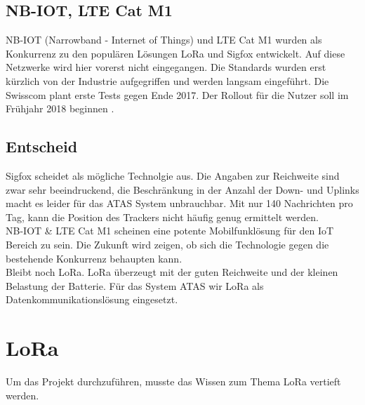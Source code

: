 \documentclass[11pt,english,german]{report}
\theoremstyle{definition}
\begin{document}
\newpage
\subsection{NB-IOT, LTE Cat M1}
NB-IOT (Narrowband - Internet of Things) und LTE Cat M1 wurden als Konkurrenz zu den populären Lösungen LoRa und Sigfox entwickelt. Auf diese Netzwerke wird hier vorerst nicht eingegangen. Die Standards wurden erst kürzlich von der Industrie aufgegriffen und werden langsam eingeführt. Die Swisscom plant erste Tests gegen Ende 2017. Der Rollout für die Nutzer soll im Frühjahr 2018 beginnen \cite{swisscomnbiot}.

\subsection{Entscheid}
Sigfox scheidet als mögliche Technolgie aus. Die Angaben zur Reichweite sind zwar sehr beeindruckend, die Beschränkung in der Anzahl der Down- und Uplinks macht es leider für das ATAS System unbrauchbar. Mit nur 140 Nachrichten pro Tag, kann die Position des Trackers nicht häufig genug ermittelt werden.\\[0.3cm]
NB-IOT \& LTE Cat M1 scheinen eine potente Mobilfunklösung für den IoT Bereich zu sein. Die Zukunft wird zeigen, ob sich die Technologie gegen die bestehende Konkurrenz behaupten kann.\\[0.3cm]
Bleibt noch LoRa. LoRa überzeugt mit der guten Reichweite und der kleinen Belastung der Batterie. Für das System ATAS wir LoRa als Datenkommunikationslösung eingesetzt.

\newpage
\section{LoRa}
Um das Projekt durchzuführen, musste das Wissen zum Thema LoRa vertieft werden.
\end{document}
